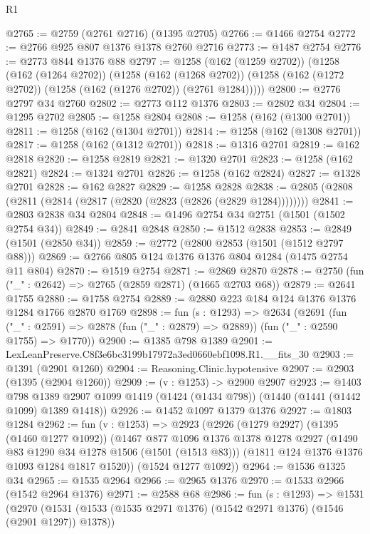 \begin{lexlean}{R1}
\begin{coremodule}
@2765 := @2759 (@2761 @2716) (@1395 @2705)
@2766 := @1466 @2754
@2772 := @2766 @925 @807 @1376 @1378 @2760 @2716
@2773 := @1487 @2754
@2776 := @2773 @844 @1376 @88
@2797 := @1258
    (@162 (@1259 @2702))
    (@1258
      (@162 (@1264 @2702))
      (@1258
        (@162 (@1268 @2702))
        (@1258 (@162 (@1272 @2702)) (@1258 (@162 (@1276 @2702)) (@2761 @1284)))))
@2800 := @2776 @2797 @34 @2760
@2802 := @2773 @112 @1376
@2803 := @2802 @34
@2804 := @1295 @2702
@2805 := @1258 @2804
@2808 := @1258 (@162 (@1300 @2701))
@2811 := @1258 (@162 (@1304 @2701))
@2814 := @1258 (@162 (@1308 @2701))
@2817 := @1258 (@162 (@1312 @2701))
@2818 := @1316 @2701
@2819 := @162 @2818
@2820 := @1258 @2819
@2821 := @1320 @2701
@2823 := @1258 (@162 @2821)
@2824 := @1324 @2701
@2826 := @1258 (@162 @2824)
@2827 := @1328 @2701
@2828 := @162 @2827
@2829 := @1258 @2828
@2838 := @2805 (@2808 (@2811 (@2814 (@2817 (@2820 (@2823 (@2826 (@2829 @1284))))))))
@2841 := @2803 @2838 @34 @2804
@2848 := @1496 @2754 @34 @2751 (@1501 (@1502 @2754 @34))
@2849 := @2841 @2848
@2850 := @1512 @2838
@2853 := @2849 (@1501 (@2850 @34))
@2859 := @2772 (@2800 @2853 (@1501 (@1512 @2797 @88)))
@2869 := @2766 @805 @124 @1376 @1376 @804 @1284 (@1475 @2754 @11 @804)
@2870 := @1519 @2754
@2871 := @2869 @2870
@2878 := @2750 (fun ("_" : @2642) => @2765 (@2859 @2871) (@1665 @2703 @68))
@2879 := @2641 @1755
@2880 := @1758 @2754
@2889 := @2880 @223 @184 @124 @1376 @1376 @1284 @1766 @2870 @1769
@2898 := fun (s : @1293) =>
  @2634
    (@2691
      (fun ("_" : @2591) => @2878 (fun ("_" : @2879) => @2889))
      (fun ("_" : @2590 @1755) => @1770))
@2900 := @1385 @798 @1389
@2901 := LexLeanPreserve.C8f3e6bc3199b17972a3ed0660ebf1098.R1.__fits_30
@2903 := @1391 (@2901 @1260)
@2904 := Reasoning.Clinic.hypotensive
@2907 := @2903 (@1395 (@2904 @1260))
@2909 := (v : @1253) -> @2900 @2907
@2923 := @1403
    @798
    @1389
    @2907
    @1099
    @1419
    (@1424 (@1434 @798))
    (@1440 (@1441 (@1442 @1099) @1389 @1418))
@2926 := @1452 @1097 @1379 @1376
@2927 := @1803 @1284
@2962 := fun (v : @1253) =>
  @2923
    (@2926
      (@1279 @2927)
      (@1395 (@1460 @1277 @1092))
      (@1467
        @877
        @1096
        @1376
        @1378
        @1278
        @2927
        (@1490 @83 @1290 @34 @1278 @1506 (@1501 (@1513 @83)))
        (@1811 @124 @1376 @1376 @1093 @1284 @1817 @1520))
      (@1524 @1277 @1092))
@2964 := @1536 @1325 @34
@2965 := @1535 @2964
@2966 := @2965 @1376
@2970 := @1533 @2966 (@1542 @2964 @1376)
@2971 := @2588 @68
@2986 := fun (s : @1293) =>
  @1531
    (@2970
      (@1531 (@1533 (@1535 @2971 @1376) (@1542 @2971 @1376) (@1546 (@2901 @1297)) @1378))

\end{coremodule}
\end{lexlean}
